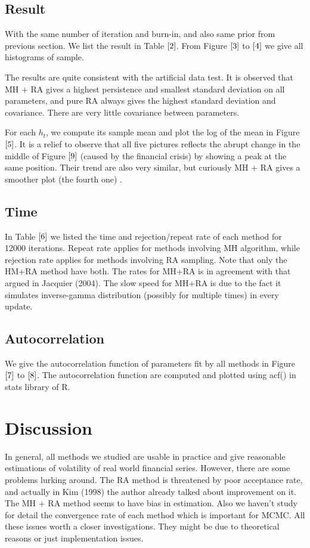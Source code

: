 \documentclass{article}
\begin{document}
\subsection{Result}
With the same number of iteration and burn-in, and also same prior from previous section. We list the result in Table $\ref{2}$. From Figure $\ref{3}$ to $\ref{4}$ we give all histograms of sample. 

The results are quite consistent with the artificial data test. It is observed that MH $+$ RA gives a highest persistence and smallest standard deviation on all parameters, and pure RA always gives the highest standard deviation and covariance. There are very little covariance between parameters.

For each $h_t$, we compute its sample mean and plot the log of the mean in Figure $\ref{5}$. It is a relief to observe that all five pictures reflects the abrupt change in the middle of Figure $\ref{9}$ (caused by the financial crisis) by showing a peak at the same position. Their trend are also very similar, but curiously MH $+$ RA gives a smoother plot (the fourth one) .


\subsection{Time}
In Table $\ref{6}$  we listed the time and rejection/repeat rate of each method for 12000 iterations. Repeat rate applies for methods involving MH algorithm, while rejection rate applies for methods involving RA sampling. Note that only the HM+RA method have both. The rates for MH$+$RA is in agreement with that argued in Jacquier (2004). The slow speed for MH$+$RA is due to the fact it simulates inverse-gamma distribution (possibly for multiple times) in every update.

\subsection{Autocorrelation}
We give the autocorrelation function of parameters fit by all methods in Figure $\ref{7}$ to $\ref{8}$. The autocorrelation function are computed and plotted using acf() in stats library of R.

\section{Discussion}
In general, all methods we studied are usable in practice and give reasonable estimations of volatility of real world financial series. However, there are some problems lurking around. The RA method is threatened by poor acceptance rate, and actually in Kim (1998) the author already talked about improvement on it.  The MH $+$ RA method seems to have bias in estimation. Also we haven't study for detail the convergence rate of each method which is important for MCMC. All these  issues worth a closer investigations. They might be due to theoretical reasons or just implementation issues.
\end{document}
